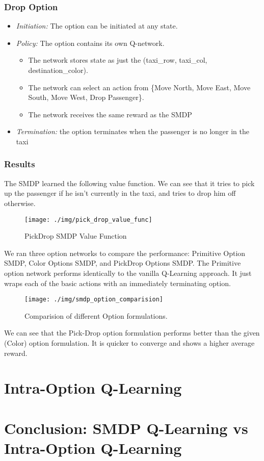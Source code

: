 \documentclass[A4]{article}
\begin{document}
    \subsubsection{Drop Option}
    \begin{itemize}
        \item \emph{Initiation:} The option can be initiated at any state.
        \item \emph{Policy:} The option contains its own Q-network.
        \begin{itemize}
            \item The network stores state as just the (taxi\_row, taxi\_col, destination\_color).
            \item The network can select an action from \{Move North, Move East, Move South, Move West, Drop Passenger\}.
            \item The network receives the same reward as the SMDP
        \end{itemize}
        \item \emph{Termination:} the option terminates when the passenger is no longer in the taxi
    \end{itemize}

    \subsubsection{Results}
    The SMDP learned the following value function.
    We can see that it tries to pick up the passenger if he isn't currently in the taxi, and tries to drop him off otherwise.

    \begin{figure}[H]
        \centering
        \texttt{[image: ./img/pick\_drop\_value\_func]}
        \caption{PickDrop SMDP Value Function}
        \label{fig:pick_drop_value_func}
    \end{figure}

    \noindent We ran three option networks to compare the performance: Primitive Option SMDP, Color Options SMDP, and PickDrop Options SMDP.
    The Primitive option network performs identically to the vanilla Q-Learning approach.
    It just wraps each of the basic actions with an immediately terminating option.
    \begin{figure}[H]
        \centering
        \texttt{[image: ./img/smdp\_option\_comparision]}
        \caption{Comparision of different Option formulations.}
        \label{fig:smdp_option_comparision}
    \end{figure}

    We can see that the Pick-Drop option formulation performs better than the given (Color) option formulation.
    It is quicker to converge and shows a higher average reward.


    \section{Intra-Option Q-Learning}


    \section{Conclusion: SMDP Q-Learning vs Intra-Option Q-Learning}
\end{document}
